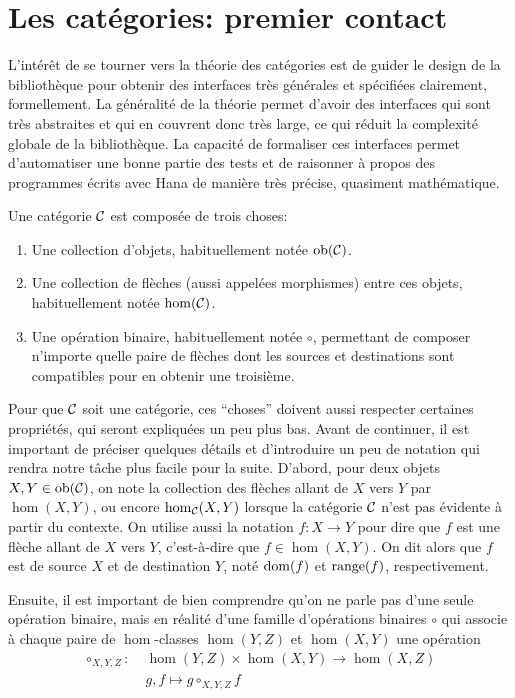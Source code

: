 \section{Les catégories: premier contact}
L'intérêt de se tourner vers la théorie des catégories est de guider le
design de la bibliothèque pour obtenir des interfaces très générales et
spécifiées clairement, formellement. La généralité de la théorie permet
d'avoir des interfaces qui sont très abstraites et qui en couvrent donc
très large, ce qui réduit la complexité globale de la bibliothèque. La
capacité de formaliser ces interfaces permet d'automatiser une bonne partie
des tests et de raisonner à propos des programmes écrits avec Hana de manière
très précise, quasiment mathématique.

\begin{définition}[Catégorie]
    Une catégorie $\mathcal{C}$ est composée de trois choses:
    \begin{enumerate}
        \item Une collection d'objets, habituellement notée $\mathrm{ob}(\mathcal{C})$.
        \item Une collection de flèches (aussi appelées morphismes) entre ces
              objets, habituellement notée $\hom(\mathcal{C})$.
        \item Une opération binaire, habituellement notée $\circ$, permettant de
              composer n'importe quelle paire de flèches dont les sources et
              destinations sont compatibles pour en obtenir une troisième.
    \end{enumerate}
\end{définition}

Pour que $\mathcal{C}$ soit une catégorie, ces ``choses'' doivent aussi respecter
certaines propriétés, qui seront expliquées un peu plus bas. Avant de
continuer, il est important de préciser quelques détails et d'introduire
un peu de notation qui rendra notre tâche plus facile pour la suite. D'abord,
pour deux objets $X, Y \in \mathrm{ob}(\mathcal{C})$, on note la collection des flèches allant
de $X$ vers $Y$ par $\hom(X, Y)$, ou encore $\hom_{\mathcal{C}}(X, Y)$ lorsque la catégorie
$\mathcal{C}$ n'est pas évidente à partir du contexte. On utilise aussi la notation
$f : X \to Y$ pour dire que $f$ est une flèche allant de $X$ vers $Y$,
c'est-à-dire que $f \in \hom(X, Y)$. On dit alors que $f$ est de source
$X$ et de destination $Y$, noté $\mathrm{dom}(f)$ et $\mathrm{range}(f)$, respectivement.

Ensuite, il est important de bien comprendre qu'on ne parle pas d'une seule
opération binaire, mais en réalité d'une famille d'opérations binaires $\circ$
qui associe à chaque paire de $\hom$-classes $\hom(Y,Z)$ et $\hom(X,Y)$ une
opération
\begin{align*}
    \circ_{X,Y,Z} : \; &\hom(Y, Z) \times \hom(X, Y) \to \hom(X, Z) \\
                       &g, f \mapsto g \circ_{X,Y,Z} f
\end{align*}

